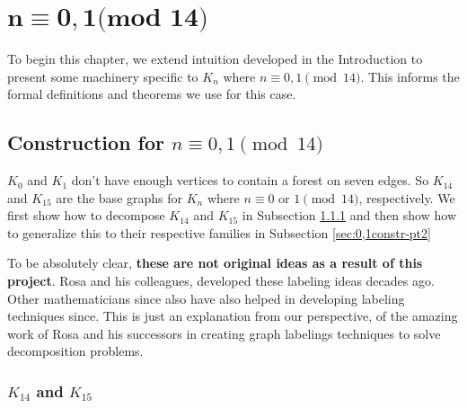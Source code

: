 \chapter{$\mathbf{n\equiv 0,1\textbf{(mod 14)}}$} \label{chap:0,1(mod 14)}

To begin this chapter, we extend intuition developed in the Introduction to present some machinery specific to $K_{n}$ where $n\equiv 0,1\pmod{14}$. This informs the formal definitions and theorems we use for this case.

\section{Construction for $n\equiv 0,1 \pmod{14}$}\label{sec:0,1constr}
$K_{0}$ and $K_{1}$ don't have enough vertices to contain a forest on seven edges. So $K_{14}$ and $K_{15}$ are the base graphs for $K_{n}$ where $n \equiv 0 \textrm{ or } 1 \pmod{14}$, respectively. We first show how to decompose $K_{14}$ and $K_{15}$ in Subsection \ref{sec:0,1constr-pt1} and then show how to generalize this to their respective families in Subsection \ref{sec:0,1constr-pt2}

To be absolutely clear, \textbf{these are not original ideas as a result of this project}. Rosa and his colleagues, developed these labeling ideas decades ago. Other mathematicians since also have also helped in developing labeling techniques since. This is just an explanation from our perspective, of the amazing work of Rosa and his successors in creating graph labelings techniques to solve decomposition problems.

\subsection{$K_{14}$ and $K_{15}$}\label{sec:0,1constr-pt1}


